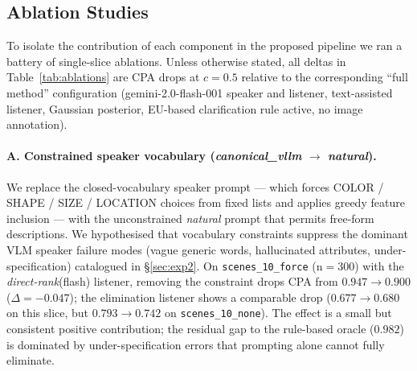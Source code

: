 %
%

\subsection{Ablation Studies}
\label{sec:ablations}

To isolate the contribution of each component in the proposed pipeline we
ran a battery of single-slice ablations.  Unless otherwise stated, all
deltas in Table~\ref{tab:ablations} are CPA drops at $c{=}0.5$ relative to
the corresponding ``full method'' configuration (gemini-2.0-flash-001
speaker and listener, text-assisted listener, Gaussian posterior, EU-based
clarification rule active, no image annotation).

\paragraph{A. Constrained speaker vocabulary
            (\textit{canonical\_vllm} $\to$ \textit{natural}).}
We replace the closed-vocabulary speaker prompt --- which forces COLOR /
SHAPE / SIZE / LOCATION choices from fixed lists and applies greedy
feature inclusion --- with the unconstrained \textit{natural} prompt that
permits free-form descriptions.
We hypothesised that vocabulary constraints suppress the dominant VLM
speaker failure modes (vague generic words, hallucinated attributes,
under-specification) catalogued in \S\ref{sec:exp2}.
On \texttt{scenes\_10\_force} (n${=}300$) with the
\textit{direct-rank}(flash) listener, removing the constraint drops CPA
from $0.947 \to 0.900$ ($\Delta {=} {-}0.047$); the elimination listener
shows a comparable drop ($0.677 \to 0.680$ on this slice, but $0.793 \to
0.742$ on \texttt{scenes\_10\_none}).
The effect is a small but consistent positive contribution; the residual
gap to the rule-based oracle ($0.982$) is dominated by under-specification
errors that prompting alone cannot fully eliminate.

